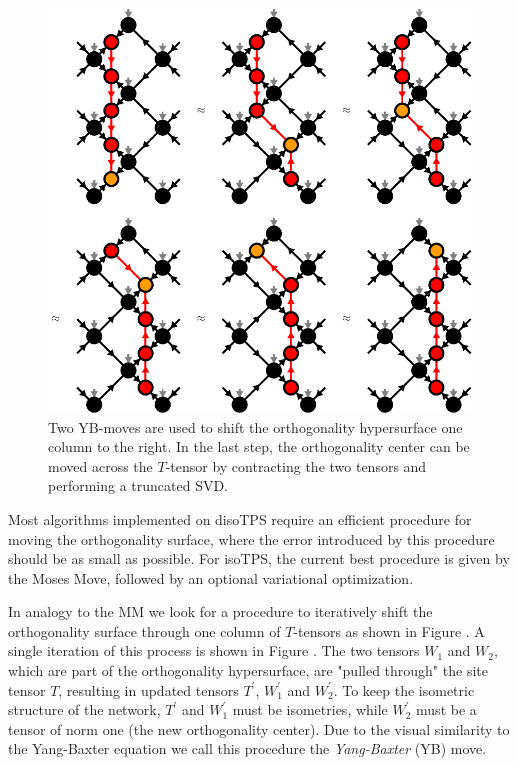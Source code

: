 \begin{figure}
	\centering
	\includegraphics[scale=1]{figures/tikz/disoTPS/shifting_ortho_surface/shifting_ortho_surface.pdf}
	\caption{Two YB-moves are used to shift the orthogonality hypersurface one column to the right. In the last step, the orthogonality center can be moved across the $T$-tensor by contracting the two tensors and performing a truncated SVD.}
	\label{fig:disoTPS_moving_ortho_surface}
\end{figure}
Most algorithms implemented on disoTPS require an efficient procedure for moving the orthogonality surface, where the error introduced by this procedure should be as small as possible. For isoTPS, the current best procedure is given by the Moses Move, followed by an optional variational optimization. \par
In analogy to the MM we look for a procedure to iteratively shift the orthogonality surface through one column of $T$-tensors as shown in Figure . A single iteration of this process is shown in Figure . The two tensors $W_1$ and $W_2$, which are part of the orthogonality hypersurface, are "pulled through" the site tensor $T$, resulting in updated tensors $T^\prime$, $W_1^\prime$ and $W_2^\prime$. To keep the isometric structure of the network, $T^\prime$ and $W_1^\prime$ must be isometries, while $W_2^\prime$ must be a tensor of norm one (the new orthogonality center). Due to the visual similarity to the Yang-Baxter equation we call this procedure the \textit{Yang-Baxter} (YB) move. \par
